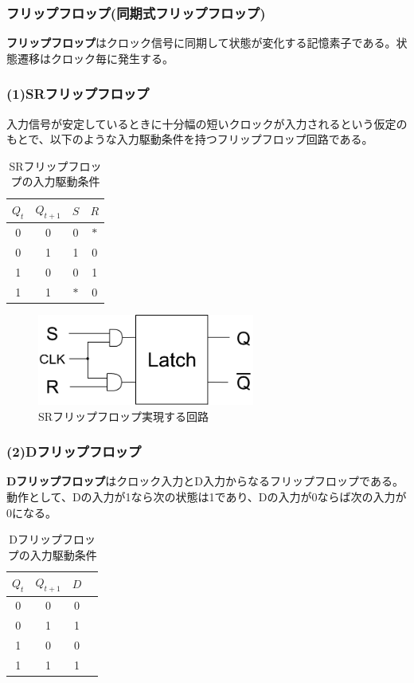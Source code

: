 \documentclass[a4j,10pt,oneside,openany,fleqn]{jsbook}
\begin{document}
\subsubsection{フリップフロップ(同期式フリップフロップ)}
\textbf{フリップフロップ}はクロック信号に同期して状態が変化する記憶素子である。状態遷移はクロック毎に発生する。

\subsubsection{(1)SRフリップフロップ}
入力信号が安定しているときに十分幅の短いクロックが入力されるという仮定のもとで、以下のような入力駆動条件を持つフリップフロップ回路である。
\begin{table}[htb]
  \begin{center}
    \begin{tabular}{cc|cc} 
      $Q_t$ & $Q_{t+1}$ & $S$ & $R$ \\ \hline 
      0 & 0 & 0 & $\ast$ \\
      0 & 1 & 1 & 0 \\
      1 & 0 & 0 & 1 \\
      1 & 1 & $\ast$ & 0 \\
    \end{tabular}
  \end{center}
  \caption{SRフリップフロップの入力駆動条件}
\end{table}
\begin{figure}[h]
  \centering\includegraphics[height=3cm]{Images/Flipflop.png}
  \caption{SRフリップフロップ実現する回路}
\end{figure}


\subsubsection{(2)Dフリップフロップ}
\textbf{Dフリップフロップ}はクロック入力とD入力からなるフリップフロップである。
動作として、Dの入力が1なら次の状態は1であり、Dの入力が0ならば次の入力が0になる。
\begin{table}[htb]
  \begin{center}
    \begin{tabular}{cc|cc} 
      $Q_t$ & $Q_{t+1}$ & $D$  \\ \hline 
      0 & 0 & 0 \\
      0 & 1 & 1 \\
      1 & 0 & 0 \\
      1 & 1 & 1 \\
    \end{tabular}
  \end{center}
  \caption{Dフリップフロップの入力駆動条件}
\end{table}
\end{document}
